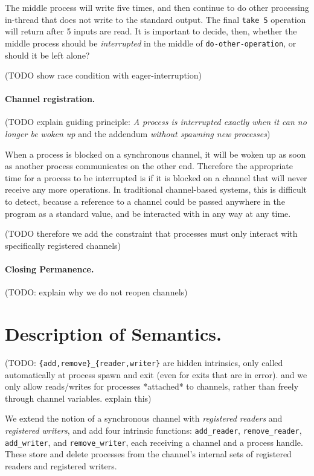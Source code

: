 \documentclass[sigplan,10pt,nosumlimits]{acmart}
\begin{document}
The middle process will write five times, and then continue to do other processing in-thread that does not write to the standard output. 
The final \verb/take 5/ operation will return after 5 inputs are read.
It is important to decide, then, whether the middle process should be \emph{interrupted} in the middle of \verb/do-other-operation/, or should it be left alone?

(TODO show race condition with eager-interruption)

\paragraph{Channel registration.}

(TODO explain guiding principle: \emph{A process is interrupted exactly when it can no longer be woken up} and the addendum \emph{without spawning new processes})

When a process is blocked on a synchronous channel, it will be woken up as soon as another process communicates on the other end.
Therefore the appropriate time for a process to be interrupted is if it is blocked on a channel that will never receive any more operations.
In traditional channel-based systems, this is difficult to detect, because a reference to a channel could be passed anywhere in the program as a standard value, and be interacted with in any way at any time.

(TODO therefore we add the constraint that processes must only interact with specifically registered channels)

\paragraph{Closing Permanence.}
(TODO: explain why we do not reopen channels)

\section{Description of Semantics.}

(TODO: \verb/{add,remove}_{reader,writer}/ are hidden intrinsics, only called automatically at process spawn and exit (even for exits that are in error). and we only allow reads/writes for processes *attached* to channels, rather than freely through channel variables. explain this)

We extend the notion of a synchronous channel with \emph{registered readers} and \emph{registered writers}, and add four intrinsic functions: \verb/add_reader/, \verb/remove_reader/, \verb/add_writer/, and \verb/remove_writer/, each receiving a channel and a process handle.
These store and delete processes from the channel's internal sets of registered readers and registered writers.
\end{document}
